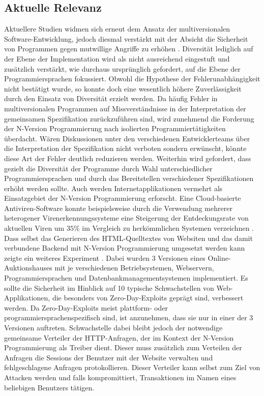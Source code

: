 \subsection{Aktuelle Relevanz}\label{bewertung-relevanz}
Aktuellere Studien widmen sich erneut dem Ansatz der multiversionalen Software-Entwicklung, jedoch diesmal verstärkt mit der Absicht die Sicherheit von Programmen gegen mutwillige Angriffe zu erhöhen \cite{current-challenges}. Diversität lediglich auf der Ebene der Implementation wird als nicht ausreichend eingestuft und zusätzlich verstärkt, wie durchaus ursprünglich gefordert, auf die Ebene der Programmiersprachen fokussiert. Obwohl die Hypothese der Fehlerunabhängigkeit nicht bestätigt wurde, so konnte doch eine wesentlich höhere Zuverlässigkeit durch den Einsatz von Diversität erzielt werden.
Da häufig Fehler in multiversionalen Programmen auf Missverständnisse in der Interpretation der gemeinsamen Spezifikation zurückzuführen sind, wird zunehmend die Forderung der N-Version Programmierung nach isolierten Programmiertätigkeiten überdacht. Wären Diskussionen unter den verschiedenen Entwicklerteams über die Interpretation der Spezifikation nicht verboten sondern erwünscht, könnte diese Art der Fehler deutlich reduzieren werden. Weiterhin wird gefordert, dass gezielt die Diversität der Programme durch Wahl unterschiedlicher Programmiersprachen und durch das Bereitstellen verschiedener Spezifikationen erhöht werden sollte. 
Auch werden Internetapplikationen vermehrt als Einsatzgebiet der N-Version Programmierung erforscht. Eine Cloud-basierte Antiviren-Software konnte beispielsweise durch die Verwendung mehrerer heterogener Virenerkennungssysteme eine Steigerung der Entdeckungsrate von aktuellen Viren um $35\%$ im Vergleich zu herkömmlichen Systemen verzeichnen \cite{Oberheide:2008:CNA:1496711.1496718}. Dass selbst das Generieren des HTML-Quelltextes von Websiten und das damit verbundene Backend mit N-Version Programmierung umgesetzt werden kann zeigte ein weiteres Experiment \cite{zero-day}. 
Dabei wurden 3 Versionen eines Online-Auktionshauses mit je verschiedenen Betriebsystemen, Webservern, Programmiersprachen und Datenbankmanagementsystemen implementiert. Es sollte die Sicherheit im Hinblick auf 10 typische Schwachstellen von Web-Applikationen, die besonders von Zero-Day-Exploits geprägt sind, verbessert werden. Da Zero-Day-Exploits meist plattform- oder programmiersprachenspezifisch sind, ist anzunehmen, dass sie nur in einer der 3 Versionen auftreten. Schwachstelle dabei bleibt jedoch der notwendige gemeinsame Verteiler der HTTP-Anfragen, der im Kontext der N-Version Programmierung als Treiber dient. Dieser muss zusätzlich zum Verteilen der Anfragen die Sessions der Benutzer mit der Website verwalten und fehlgeschlagene Anfragen protokollieren.
Dieser Verteiler kann selbst zum Ziel von Attacken werden und falls kompromittiert, Transaktionen im Namen eines beliebigen Benutzers tätigen.